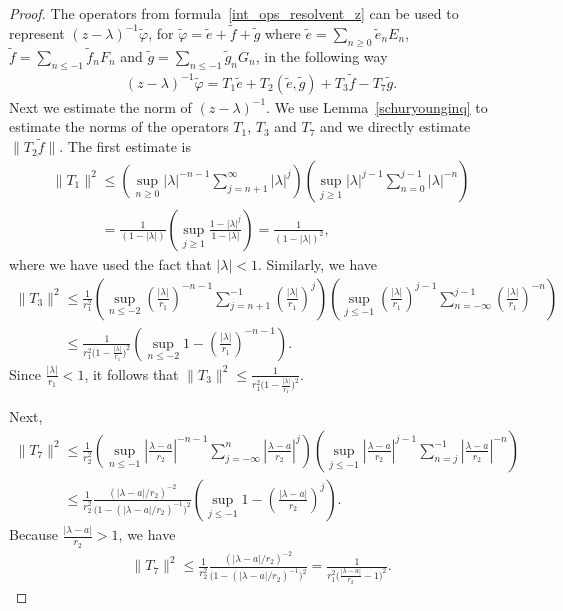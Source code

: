 \documentclass[11pt]{article}
\numberwithin{equation}{section}
\begin{document}
\begin{proof}
The operators from formula~\eqref{int_ops_resolvent_z} can be used to represent $(z-\lambda)^{-1}\tilde{\varphi}$, for
$\tilde{\varphi}=\tilde{e}+\tilde{f}+\tilde{g}$ where $\tilde{e}=\sum\limits_{n\ge0}\tilde{e}_nE_n$,
$\tilde{f}=\sum\limits_{n\le -1}\tilde{f}_nF_n$ and $\tilde{g}=\sum\limits_{n\le -1}\tilde{g}_nG_n$, in the following way
\begin{gather*}
(z-\lambda)^{-1}\tilde{\varphi}=T_1\tilde{e}+T_2(\tilde{e},\tilde{g})+T_3\tilde{f}-T_7\tilde{g}.
\end{gather*}
Next we estimate the norm of $(z-\lambda)^{-1}$.
We use Lemma~\ref{schuryounginq} to estimate the norms of the operators $T_1$, $T_3$ and $T_7$ and we directly estimate
$\|T_2\tilde{f}\|$.
The f\/irst estimate is
\begin{gather*}
\|T_1\|^2
\leq \left(\sup_{n \geq 0} |\lambda|^{-n-1} \sum\limits_{j=n+1}^{\infty}|\lambda|^j \right)\left(\sup_{j \geq 1} |\lambda|^{j-1}
\sum\limits_{n=0}^{j-1}|\lambda|^{-n} \right)
\\
\phantom{\|T_1\|^2}{}
=\frac 1{\left(1-|\lambda|\right)}\left(\sup_{j \geq 1} \frac{1-|\lambda|^j}{1-|\lambda|} \right)=\frac1{\left(1-|\lambda|\right)^2},
\end{gather*}
where we have used the fact that $|\lambda|<1$.
Similarly, we have
\begin{gather*}
\|T_3\|^2
\leq \frac 1{r_1^2}\left(\sup_{n \leq -2} \left(\frac{|\lambda|}{r_1}\right)^{-n-1}
\sum\limits_{j=n+1}^{-1}\left(\frac{|\lambda|}{r_1}\right)^j \right) \left(\sup_{j \leq -1}
\left(\frac{|\lambda|}{r_1}\right)^{j-1} \sum\limits_{n=-\infty}^{j-1}\left(\frac{|\lambda|}{r_1}\right)^{-n} \right)
\\
\phantom{\|T_3\|^2}{}
  \leq \frac 1{r_1^2 \big(1- \frac{|\lambda|}{r_1}\big)^2} \left(\sup_{n\leq -2}
1-\left(\frac{|\lambda|}{r_1}\right)^{-n-1}\right).
\end{gather*}
Since $\frac{|\lambda|}{r_1} <1$, it follows that $\|T_3\|^2 \leq \frac{1}{r_1^2\big(1- \frac{|\lambda|}{r_1}\big)^2}$.

Next,
\begin{gather*}
\|T_7\|^2  \leq \frac 1{r_2^2} \left(\sup_{n \leq -1} \left|\frac{\lambda -a}{r_2} \right|^{-n-1}
\sum\limits_{j=-\infty}^n \left|\frac{\lambda -a}{r_2} \right|^j \right) \left(\sup_{j \leq -1} \left|\frac{\lambda
-a}{r_2} \right|^{j-1} \sum\limits_{n=j}^{-1} \left|\frac{\lambda -a}{r_2} \right|^{-n} \right)
\\
\phantom{\|T_7\|^2}{}
  \leq \frac 1{r_2^2} \frac{(|\lambda -a|/ r_2)^{-2}}{\big(1- (|\lambda -a|/ r_2)^{-1}\big)^2} \left(\sup_{j \leq -1} 1-
\left(\frac{|\lambda -a|}{r_2}\right)^j\right).
\end{gather*}
Because $\frac{|\lambda -a|}{r_2}>1$, we have
\begin{gather*}
\|T_7\|^2 \leq \frac 1{r_2^2} \frac{(|\lambda -a|/ r_2)^{-2}}{\big(1- (|\lambda -a|/ r_2)^{-1}\big)^2}=\frac {1}{r_1^2
\big(\frac{|\lambda -a|}{r_2} -1\big)^2}.
\end{gather*}


\end{proof}
\end{document}
